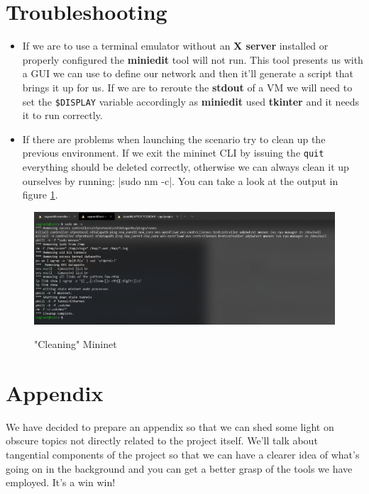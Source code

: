 \documentclass[12pt]{article}
\begin{document}
\newpage

\section{Troubleshooting}
	\begin{itemize}
		\item If we are to use a terminal emulator without an \textbf{X server} installed or properly configured the \textbf{miniedit} tool will not run. This tool presents us with a GUI we can use to define our network and then it'll generate a script that brings it up for us. If we are to reroute the \textbf{stdout} of a VM we will need to set the \texttt{\$DISPLAY} variable accordingly as \textbf{miniedit} used \textbf{tkinter} and it needs it to run correctly.
		\item If there are problems when launching the scenario try to clean up the previous environment. If we exit the mininet CLI by issuing the \texttt{quit} everything should be deleted correctly, otherwise we can always clean it up ourselves by running: |sudo nm -c|. You can take a look at the output in figure \ref{f:mn_clean}.
	\end{itemize}

	\begin{figure}[!htb]
		\centering
		\includegraphics[width=\linewidth]{mn_clean.png}
		\label{f:mn_clean}
		\caption{"Cleaning" Mininet}
	\end{figure}

\newpage

\section{Appendix}
	We have decided to prepare an appendix so that we can shed some light on obscure topics not directly related to the project itself. We'll talk about tangential components of the project so that we can have a clearer idea of what's going on in the background and you can get a better grasp of the tools we have employed. It's a win win!
\end{document}
